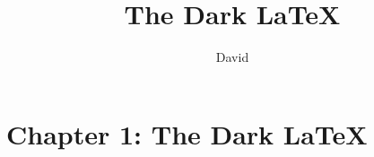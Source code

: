 \documentclass[10pt,%
  a4paper,%
  twoside,%
  openany%
  ]{book}
\title{The Dark \LaTeX}
\author{David}
\date{\thedate}
\begin{document}
\makeatletter


\selectfont


\frontmatter

\titlebackgroundimg{}
\lipsum[1] %
\clearpage


\begingroup
\let\clearpage\relax
\tocbackgroundimg{}

\tableofcontents
\endgroup
\clearpage

\mainmatter{}

\chapter{Chapter 1: The Dark \LaTeX}
\end{document}
